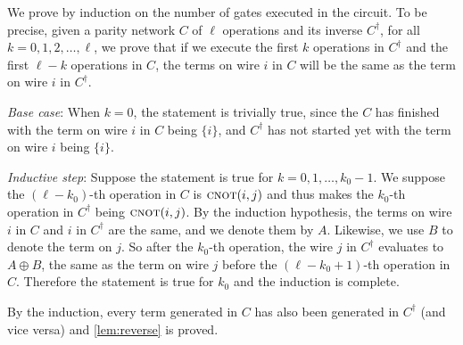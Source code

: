\documentclass[a4paper,cleveref, autoref, 11pt, fleqn, thm-restate]{article}
\theoremstyle{plain}
\newcommand{\rowadd}[1]{\textsc{cnot}(#1)}
\begin{document}
We prove by induction on the number of gates executed in the circuit. To be precise, given a parity network $C$ of $\ell$ operations and its inverse $C^{\dagger}$, for all $k=0,1,2,\dots,\ell$, we prove that if we execute the first $k$ operations in $C^{\dagger}$ and the first $\ell-k$ operations in $C$, the terms on wire $i$ in $C$ will be the same as the term on wire $i$ in $C^{\dagger}$.

\textit{Base case}: When $k=0$, the statement is trivially true, since the $C$ has finished with the term on wire $i$ in $C$ being $\{i\}$, and $C^{\dagger}$ has not started yet with the term on wire $i$ being $\{i\}$.

\textit{Inductive step}: Suppose the statement is true for $k=0,1,\dots,k_0-1$. %
We suppose the $(\ell-k_0)$-th operation in $C$ is $\rowadd{i,j}$ and thus makes the $k_0$-th operation in $C^{\dagger}$ being $\rowadd{i,j}$. By the induction hypothesis, the terms on wire $i$ in $C$ and $i$ in $C^{\dagger}$ are the same, and we denote them by $A$. Likewise, we use $B$ to denote the term on $j$. So after the $k_0$-th operation, the wire $j$ in $C^{\dagger}$ evaluates to $A\oplus B$, the same as the term on wire $j$ before the $(\ell-k_0+1)$-th operation in $C$. Therefore the statement is true for $k_0$ and the induction is complete.
\begin{center}
\end{center}
By the induction, every term generated in $C$ has also been generated in $C^{\dagger}$ (and vice versa) and \cref{lem:reverse} is proved.
\end{document}
